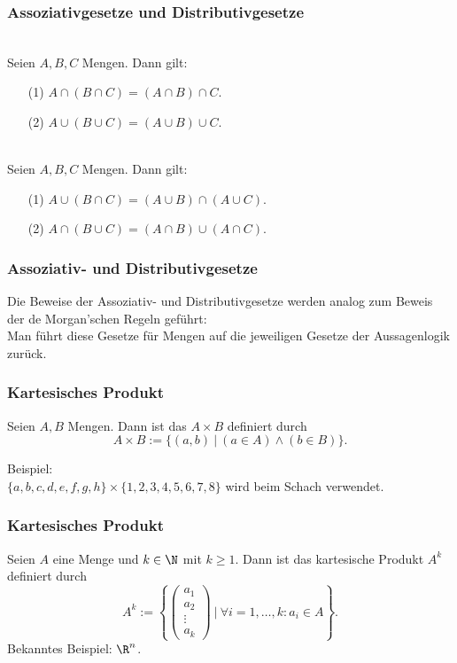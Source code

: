 %
%
\begin{frame}\frametitle{Assoziativgesetze und Distributivgesetze}
	
	\\
	Seien $A,B,C$ Mengen. Dann gilt:
	\begin{itemize}
		\item[(1)] $A\cap(B \cap C) = (A \cap B) \cap C.$
		\item[(2)] $A\cup(B \cup C) = (A \cup B) \cup C.$
	\end{itemize}\pause
	\vfill

	\\
	Seien $A,B,C$ Mengen. Dann gilt:
	\begin{itemize}
		\item[(1)] $A\cup(B \cap C) = (A \cup B) \cap (A\cup C).$
		\item[(2)] $A\cap(B \cup C) = (A \cap B) \cup (A\cap C).$
	\end{itemize}
	
\end{frame}
%
%
\begin{frame}\frametitle{Assoziativ- und Distributivgesetze}

	Die Beweise der Assoziativ- und Distributivgesetze werden analog zum Beweis der de Morgan'schen Regeln geführt: \\
	Man führt diese Gesetze für Mengen auf die jeweiligen Gesetze der Aussagenlogik zurück.
	
\end{frame}
%
%
\begin{frame}\frametitle{Kartesisches Produkt}

	Seien $A,B$ Mengen. Dann ist das  $A\times B$ definiert durch
	$$
		A\times B := \big\{ (a,b) ~|~ (a\in A) \land (b\in B) \big\}.
	$$
	
	\vfill
	\pause
	Beispiel:\\
	$ \{a,b,c,d,e,f,g,h \} \times \{1,2,3,4,5,6,7,8\}$ wird beim Schach verwendet.
\end{frame}
%
%
\begin{frame}\frametitle{Kartesisches Produkt}

	Seien $A$ eine Menge und $k\in \N$ mit $k\geq 1$. Dann ist das kartesische Produkt $A^k$ definiert durch
	$$
		A^k := \left\{ 
				\begin{pmatrix} a_1\\a_2\\\vdots \\ a_k \end{pmatrix}
				 ~\Big|~ \forall i=1,\ldots,k : a_i \in A \right\}.
	$$
	\vfill
	Bekanntes Beispiel: $\R^n$.
\end{frame}
%
